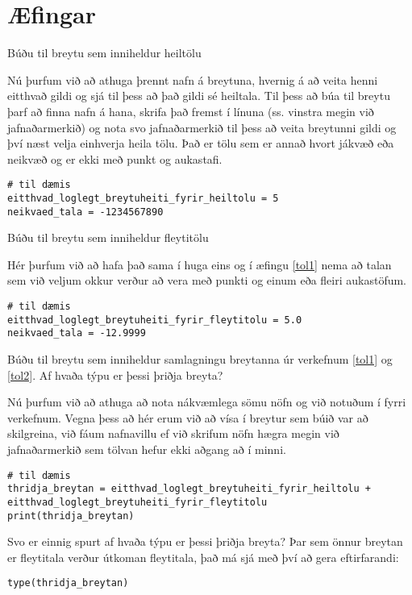 \newpage

\section{Æfingar}
\begin{exercise}\label{tol1}
		Búðu til breytu sem inniheldur heiltölu
	\end{exercise}
	\begin{Answer}[ref={tol1}]
		Nú þurfum við að athuga þrennt nafn á breytuna, hvernig á að veita henni eitthvað gildi og sjá til þess að það gildi sé heiltala.
		Til þess að búa til breytu þarf að finna nafn á hana, skrifa það fremst í línuna (ss. vinstra megin við jafnaðarmerkið) og nota svo jafnaðarmerkið til þess að veita breytunni gildi og því næst velja einhverja heila tölu.
		Það er tölu sem er annað hvort jákvæð eða neikvæð og er ekki með punkt og aukastafi.
\begin{lstlisting}
# til dæmis
eitthvad_loglegt_breytuheiti_fyrir_heiltolu = 5
neikvaed_tala = -1234567890\end{lstlisting}
\end{Answer}

\begin{exercise}\label{tol2}
	Búðu til breytu sem inniheldur fleytitölu
\end{exercise}
\begin{Answer}[ref={tol2}]
	Hér þurfum við að hafa það sama í huga eins og í æfingu \ref{tol1} nema að talan sem við veljum okkur verður að vera með punkti og einum eða fleiri aukastöfum.
\begin{lstlisting}
# til dæmis
eitthvad_loglegt_breytuheiti_fyrir_fleytitolu = 5.0
neikvaed_tala = -12.9999\end{lstlisting}
\end{Answer}

\begin{exercise}\label{tol2-5}
	Búðu til breytu sem inniheldur samlagningu breytanna úr verkefnum \ref{tol1} og \ref{tol2}. Af hvaða týpu er þessi þriðja breyta?
\end{exercise}
\begin{Answer}[ref={tol2-5}]
	Nú þurfum við að athuga að nota nákvæmlega sömu nöfn og við notuðum í fyrri verkefnum.
	Vegna þess að hér erum við að vísa í breytur sem búið var að skilgreina, við fáum nafnavillu ef við skrifum nöfn hægra megin við jafnaðarmerkið sem tölvan hefur ekki aðgang að í minni.
\begin{lstlisting}
# til dæmis
thridja_breytan = eitthvad_loglegt_breytuheiti_fyrir_heiltolu + eitthvad_loglegt_breytuheiti_fyrir_fleytitolu
print(thridja_breytan)\end{lstlisting}
	Svo er einnig spurt af hvaða týpu er þessi þriðja breyta?
	Þar sem önnur breytan er fleytitala verður útkoman fleytitala, það má sjá með því að gera eftirfarandi:
	
\begin{lstlisting}
type(thridja_breytan)\end{lstlisting}
\end{Answer}



